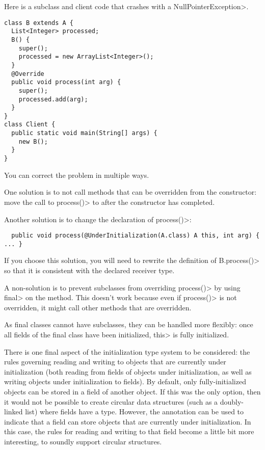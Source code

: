 Here is a subclass and client code that crashes with a \<NullPointerException>.

\begin{Verbatim}
class B extends A {
  List<Integer> processed;
  B() {
    super();
    processed = new ArrayList<Integer>();
  }
  @Override
  public void process(int arg) {
    super();
    processed.add(arg);
  }
}
class Client {
  public static void main(String[] args) {
    new B();
  }
}
\end{Verbatim}

You can correct the problem in multiple ways.

One solution is to not call methods that can be overridden from the
constructor:  move the call to \<process()> to after the constructor has
completed.

Another solution is to change the declaration of \<process()>:

\begin{Verbatim}
  public void process(@UnderInitialization(A.class) A this, int arg) { ... }
\end{Verbatim}

If you choose this solution, you will need to rewrite the definition of
\<B.process()> so that it is consistent with the declared receiver type.

A non-solution is to prevent subclasses from overriding \<process()> by
using \<final> on the method.  This doesn't work because even if
\<process()> is not overridden, it might call other methods that are
overridden.

As final classes cannot have subclasses, they can be handled more
flexibly: once all fields of the final class have been
initialized, \<this> is fully initialized.





There is one final aspect of the initialization type system to be
considered:  the rules governing reading and writing to objects that are
currently under initialization (both reading from fields of objects under
initialization, as well as writing objects under initialization to fields).
By default, only fully-initialized objects can be stored in a field of
another object.  If this was the only option, then it would not be possible
to create circular data structures (such as a doubly-linked list) where
fields have a  type.  However,
the annotation
 can be used to
indicate that a field can store objects that are currently under initialization.
In this case, the rules for reading and writing to that field become a little
bit more interesting, to soundly support circular structures.

